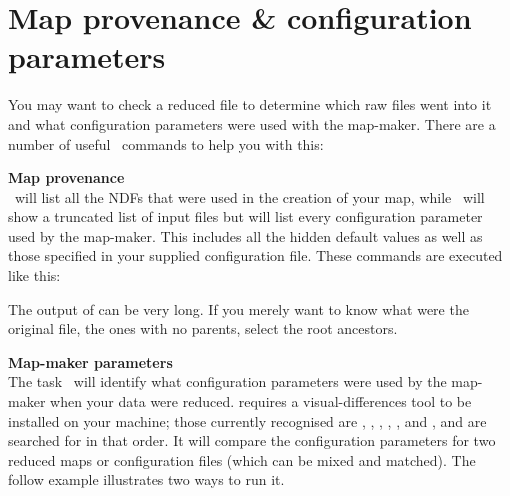 \documentclass[11pt,oneside,chapters]{starlink}
\begin{document}


\section{Map provenance \& configuration parameters}
\label{sec:prov}

You may want to check a reduced file to determine which raw files went
into it and what configuration parameters were used with the
map-maker. There are a number of useful \Kappa\ commands to help you
with this:

\textbf{Map provenance}\\
\provshow\ will list all the NDFs that were used in the creation of
your map, while \hislist\ will show a truncated list of input files
but will list every configuration parameter used by the map-maker.
This includes all the hidden default values as well as those specified
in your supplied configuration file. These commands are executed like
this:
\begin{terminalv}
\end{terminalv}

The output of  can be very long.  If you merely want to
know what were the original file, the ones with no parents, select
the root ancestors.

\begin{terminalv}
\end{terminalv}


\textbf{Map-maker parameters}\\
The task \configmeld\ will identify what configuration parameters were
used by the map-maker when your data were reduced. 
requires a visual-differences tool to be installed on your machine;
those currently recognised are
,
,
,
,
, and
,
and are searched for in that order. It will compare the
configuration parameters for two reduced maps or configuration files
(which can be mixed and matched). The follow example illustrates two
ways to run it.
\end{document}
